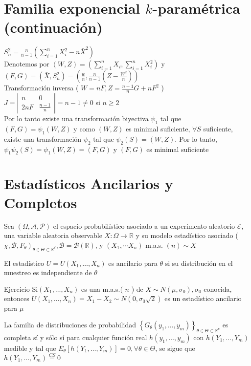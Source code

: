 \section*{Familia exponencial $k$-paramétrica (continuación)}
$S_{n}^{2}=\frac{n}{n-1}\left(\sum_{i=1}^{n} X_{i}^{2}-n \bar{X}^{2}\right)$\\
Denotemos por $(W, Z)=\left(\sum_{i=1}^{n} X_{i}, \sum_{i=1}^{n} X_{i}^{2}\right)$ y\\
$(F, G)=\left(\bar{X}, S_{n}^{2}\right)=\left(\frac{w}{n}, \frac{n}{n-1}\left(Z-\frac{W^{2}}{n}\right)\right)$\\
Transformación inversa ( $W=n F, Z=\frac{n-1}{n} G+n F^{2}$ )\\
$J=\left|\begin{array}{ll}n & 0 \\ 2 n F & \frac{n-1}{n}\end{array}\right|=n-1 \neq 0$ si $n \geq 2$\\
Por lo tanto existe una transformación biyectiva $\psi_{1}$ tal que $(F, G)=\psi_{1}(W, Z)$ y como $(W, Z)$ es minimal suficiente, $\forall S$ suficiente, existe una transformación $\psi_{2}$ tal que $\psi_{2}(S)=(W, Z)$. Por lo tanto, $\psi_{1} \psi_{2}(S)=\psi_{1}(W, Z)=(F, G)$ y $(F, G)$ es minimal suficiente

\section*{Estadísticos Ancilarios y Completos}
Sea $(\Omega, \mathcal{A}, \mathcal{P})$ el espacio probabilístico asociado a un experimento aleatorio $\mathcal{E}$, una variable aleatoria observable $X: \Omega \longrightarrow \mathbb{R}$ y su modelo estadístico asociado ( $\left.\chi, \mathcal{B}, F_{\theta}\right)_{\theta \in \Theta \subset \mathbb{R}^{\ell}}, \mathcal{B}=\mathcal{B}(\mathbb{R})$, y $\left(X_{1}, \cdots X_{n}\right)$ m.a.s. $(n) \sim X$

El estadístico $U=U\left(X_{1}, \ldots, X_{n}\right)$ es ancilario para $\theta$ si su distribución en el muestreo es independiente de $\theta$

Ejercicio $\mathrm{Si}\left(X_{1}, \ldots, X_{n}\right)$ es una m.a.s.( $n$ ) de $X \sim N\left(\mu, \sigma_{0}\right), \sigma_{0}$ conocida, entonces $U\left(X_{1}, \ldots, X_{n}\right)=X_{1}-X_{2} \sim N\left(0, \sigma_{0} \sqrt{2}\right)$ es un estadístico ancilario para $\mu$

La familia de distribuciones de probabilidad $\left\{G_{\theta}\left(y_{1}, \ldots, y_{m}\right)\right\}_{\theta \in \Theta \subset \mathbb{R}^{e}}$ es completa sí y sólo sí para cualquier función real $h\left(y_{1}, \ldots, y_{m}\right)$ con $h\left(Y_{1}, \ldots, Y_{m}\right)$ medible y tal que $E_{\theta}\left[h\left(Y_{1}, \ldots, Y_{m}\right)\right]=0, \forall \theta \in \Theta$, se sigue que $h\left(Y_{1}, \ldots, Y_{m}\right) \stackrel{C S}{=} 0$

